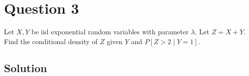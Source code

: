 \section*{Question 3}

Let \( X, Y \) be iid exponential random variables with parameter \( \lambda \).
Let \( Z=X+Y \).
Find the conditional density of \( Z \) given \( Y \) and \( P[Z>2 \mid Y=1] \).

\subsection*{Solution}
